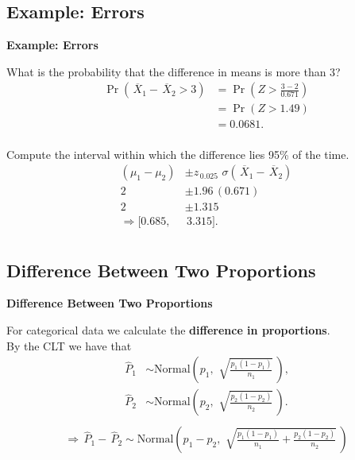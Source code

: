 \documentclass[compress]{beamer}        %
\makeatletter
\newcommand{\tcb}{\textcolor{beamer@blendedblue}}
\makeatother
\begin{document}
\subsection{Example: Errors}
\begin{frame}{\bf \tcb{Example: Errors}}

What is the probability that the difference in means is more than 3?
\begin{align*}
\Pr(\,\overline{\!X}_1 - \,\overline{\!X}_2 > 3) &= \Pr(Z > \tfrac{3-2}{0.671})\\
&= \Pr(Z > 1.49)\\
&=0.0681.\\
\end{align*}

Compute the interval within which the difference lies 95\% of the time.
\begin{align*}
(\mu_1-\mu_2) &\pm z_{\,0.025} \,\,\sigma(\,\overline{\!X}_1-\,\overline{\!X}_2)\\[0.2cm]
2 &\pm 1.96 \,(0.671) \\[0.2cm]
2 &\pm 1.315 \\[0.5cm]
\Rightarrow [0.685,&\,3.315].\\
\end{align*}


\end{frame}











\subsection{Difference Between Two Proportions}
\begin{frame}{\bf \tcb{Difference Between Two Proportions}}

For categorical data we calculate the {\bf difference in proportions}.\\[0.3cm]
By the CLT we have that
\begin{align*}
\,\widehat{\!P}_1 &\sim \text{Normal}\left(p_1,\,\, \sqrt{\frac{p_1(1-p_1)}{n_1}}\,\right),\\[0.4cm]
\,\widehat{\!P}_2 &\sim \text{Normal}\left(p_2,\,\, \sqrt{\frac{p_2(1-p_2)}{n_2}}\,\right).\\[-0.3cm]
\end{align*}
\begin{align*}
\Rightarrow \boxed{\,\widehat{\!P}_1 - \,\widehat{\!P}_2 \sim \text{Normal}\left(p_1-p_2,\,\, \sqrt{\frac{p_1(1-p_1)}{n_1}+ \frac{p_2(1-p_2)}{n_2}}\,\right)}
\end{align*}

\end{frame}
\end{document}
